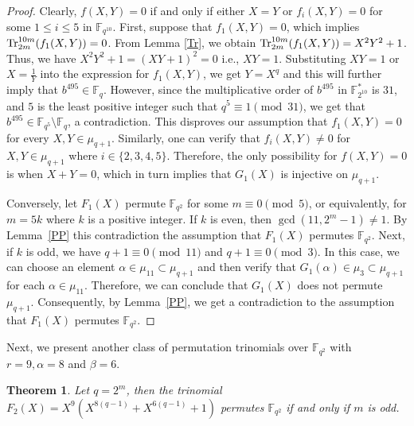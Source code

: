 \documentclass[12pt,reqno]{amsart}
\newtheorem{thm}{Theorem}[section]
\numberwithin{equation}{section}
\theoremstyle{definition}
\newcommand{\F}{\mathbb F}
\def\Tr{{\rm Tr}}
\begin{document}
\begin{proof}
Clearly, $f(X, Y) = 0$ if and only if either $X=Y$ or $f_i(X,Y)=0$ for some $1 \leq i \leq 5$ in $\mathbb{F}_{q^{10}}$. First, suppose that $f_{1}(X,Y)=0$, which implies $\Tr_{2m}^{10m}(f_1(X,Y))=0$. From Lemma \ref{Tr}, we obtain $\Tr_{2m}^{10m}(f_1(X,Y))=X^2Y^2+1$. Thus, we have $X^2Y^2+1=(XY+1)^2=0$ i.e., $XY=1$. Substituting $XY=1$ or $X= \frac{1}{Y}$ into the expression for $f_1(X, Y)$, we get $Y=X^q$ and this will further imply that $b^{495}\in\F_{q}.$ However, since the multiplicative order of $b^{495}$ in $\mathbb{F}_{2^{10}}^{*}$ is $31$, and $5$ is the least positive integer such that $q^{5}\equiv 1\pmod{31}$, we get that $b^{495}\in\F_{q^5}\setminus \F_{q}$, a contradiction. This disproves our assumption that $f_{1}(X,Y)=0$ for every $X,Y\in \mu_{q+1}$. Similarly, one can verify that $f_{i}(X,Y)\neq 0$ for $X,Y\in \mu_{q+1}$ where $i\in\{2,3,4,5\}$. Therefore, the only possibility for $f(X,Y)=0$ is when $X+Y=0$, which in turn implies that $G_1(X)$ is injective on $\mu_{q+1}$.
	
Conversely, let $F_1(X)$ permute $\F_{q^2}$ for some $m \equiv 0 \pmod 5$, or equivalently, for $m=5k$ where $k$ is a positive integer. If $k$ is even, then $\gcd(11, 2^m-1) \neq 1$. By Lemma~\ref{PP} this contradiction the assumption that $F_1(X)$ permutes $\F_{q^2}$. Next, if $k$ is odd, we have $q+1 \equiv 0 \pmod{11}$ and $q + 1 \equiv 0 \pmod{3}$. In this case, we can choose an element $\alpha \in \mu_{11} \subset \mu_{q+1}$ and then verify that $G_{1}(\alpha) \in \mu_3 \subset \mu_{q+1}$ for each $\alpha \in \mu_{11}$. Therefore, we can conclude that $G_{1}(X)$ does not permute $\mu_{q+1}$. Consequently, by Lemma~\ref{PP}, we get a contradiction to the assumption that $F_{1}(X)$ permutes $\mathbb{F}_{q^2}$.
\end{proof}
Next, we present another class of permutation trinomials over $\F_{q^2}$ with $r=9, \alpha=8$ and $\beta=6$.
\begin{thm}\label{T2}
Let $q=2^m$, then the trinomial $F_{2}(X)=X^{9}(X^{8(q-1)} + X^{6(q-1)} + 1)$ permutes $\F_{q^2}$ if and only if $m$ is odd.
\end{thm}
\end{document}

